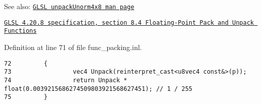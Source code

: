 \begin{Desc}
\item[See also:]\href{http://www.opengl.org/sdk/docs/manglsl/xhtml/unpackUnorm4x8.xml}{\tt GLSL unpackUnorm4x8 man page} 

\href{http://www.opengl.org/registry/doc/GLSLangSpec.4.20.8.pdf}{\tt GLSL 4.20.8 specification, section 8.4 Floating-Point Pack and Unpack Functions} \end{Desc}


Definition at line 71 of file func\_\-packing.inl.

\begin{Code}\begin{verbatim}72         {
73                 vec4 Unpack(reinterpret_cast<u8vec4 const&>(p));
74                 return Unpack * float(0.0039215686274509803921568627451); // 1 / 255
75         }
\end{verbatim}
\end{Code}


